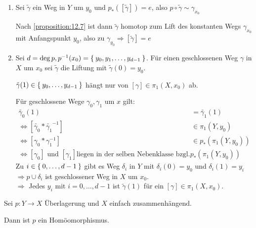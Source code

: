 \begin{beweis}\leavevmode
    \begin{enumerate}[label=\alph*)]
        \item Sei $\tilde{\gamma}$ ein Weg in $Y$ um $y_0$ und
              $p_* ([\tilde{\gamma}]) = e$, also $p \circ \tilde{\gamma} \sim \gamma_{x_0}$

              Nach \cref{proposition:12.7} ist dann 
              $\tilde{\gamma}$ homotop zum Lift des konstanten Wegs
              $\gamma_{x_0}$ mit Anfangspunkt $y_0$, also zu
              $\gamma_{y_0} \Rightarrow [\tilde{\gamma}] = e$
        \item Sei $d = \deg{p}, p^{-1}(x_0) = \Set{y_0, y_1, \dots, y_{d-1}}$.
              Für einen geschlossenen Weg $\gamma$ in $X$ um $x_0$
              sei $\tilde{\gamma}$ die Liftung mit $\tilde{\gamma}(0) = y_0$.

              $\tilde{\gamma}(1) \in \Set{y_0, \dots, y_{d-1}}$ hängt
              nur von $[\gamma] \in \pi_1(X,x_0)$ ab.

              Für geschlossene Wege $\gamma_0, \gamma_1$ um $x$ gilt:
              \begin{align*}
                \tilde{\gamma_0}(1) &= \tilde{\gamma_1}(1)\\
                \Leftrightarrow [\tilde{\gamma_0} * \tilde{\gamma_1}^{-1}] &\in \pi_1(Y, y_0)\\
                \Leftrightarrow [\gamma_0 * \gamma_1^{-1}] &\in p_* (\pi_1(Y,y_0))\\
                \Leftrightarrow [\gamma_0] \text{ und } [\gamma_1] \text{liegen in der selben Nebenklasse bzgl.} p_*(\pi_1(Y, y_0))
              \end{align*}
              Zu $i \in \Set{0, \dots, d-1}$ gibt es Weg $\delta_i$ in
              $Y$ mit $\delta_i(0) = y_0$ und $\delta_i(1) = y_i$\\
              $\Rightarrow p \cup \delta_i$ ist geschlossener Weg in 
              $X$ um $x_0$.\\
              $\Rightarrow$ Jedes $y_i$ mit $i=0, \dots, d-1$ ist 
              $\tilde{\gamma}(1)$ für ein $[\gamma] \in \pi_1(X,x_0)$.
    \end{enumerate}
\end{beweis}

\begin{bemerkung}%
    Sei $p: Y \rightarrow X$ Überlagerung und $X$ einfach zusammenhängend.

    Dann ist $p$ ein Homöomorphismus.
\end{bemerkung}


